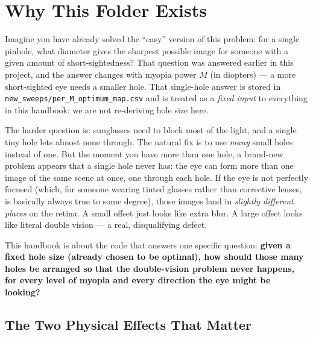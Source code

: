 \section{Why This Folder Exists}

Imagine you have already solved the ``easy'' version of this problem: for a
single pinhole, what diameter gives the sharpest possible image for someone
with a given amount of short-sightedness? That question was answered earlier
in this project, and the answer changes with myopia power $M$ (in diopters)
--- a more short-sighted eye needs a smaller hole. That single-hole answer is
stored in \texttt{new\_sweeps/per\_M\_optimum\_map.csv} and is treated as a
\emph{fixed input} to everything in this handbook: we are not re-deriving hole
size here.

The harder question is: sunglasses need to block most of the light, and a
single tiny hole lets almost none through. The natural fix is to use
\emph{many} small holes instead of one. But the moment you have more than one
hole, a brand-new problem appears that a single hole never has: the eye can
form more than one image of the same scene at once, one through each hole.
If the eye is not perfectly focused (which, for someone wearing tinted
glasses rather than corrective lenses, is basically always true to some
degree), those images land in \emph{slightly different places} on the
retina. A small offset just looks like extra blur. A large offset looks like
literal double vision --- a real, disqualifying defect.

This handbook is about the code that answers one specific question:
\textbf{given a fixed hole size (already chosen to be optimal), how should
those many holes be arranged so that the double-vision problem never
happens, for every level of myopia and every direction the eye might be
looking?}

\subsection{The Two Physical Effects That Matter}

